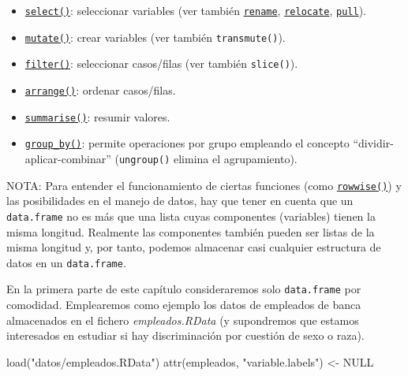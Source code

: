 \documentclass[
]{book}
\newenvironment{Shaded}{\begin{snugshade}}{\end{snugshade}}
\newcommand{\ConstantTok}[1]{\textcolor[rgb]{0.00,0.00,0.00}{#1}}
\newcommand{\FunctionTok}[1]{\textcolor[rgb]{0.00,0.00,0.00}{#1}}
\newcommand{\NormalTok}[1]{#1}
\newcommand{\OtherTok}[1]{\textcolor[rgb]{0.56,0.35,0.01}{#1}}
\newcommand{\StringTok}[1]{\textcolor[rgb]{0.31,0.60,0.02}{#1}}
\theoremstyle{break}
\theoremstyle{nonumberplain}
\begin{document}
\begin{itemize}
\item
  \href{https://dplyr.tidyverse.org/reference/select.html}{\texttt{select()}}: seleccionar variables (ver también \href{https://dplyr.tidyverse.org/reference/rename.html}{\texttt{rename}}, \href{https://dplyr.tidyverse.org/reference/rename.html}{\texttt{relocate}}, \href{https://dplyr.tidyverse.org/reference/rename.html}{\texttt{pull}}).
\item
  \href{https://dplyr.tidyverse.org/reference/mutate.html}{\texttt{mutate()}}: crear variables (ver también \texttt{transmute()}).
\item
  \href{https://dplyr.tidyverse.org/reference/filter.html}{\texttt{filter()}}: seleccionar casos/filas (ver también \texttt{slice()}).
\item
  \href{https://dplyr.tidyverse.org/reference/arrange.html}{\texttt{arrange()}}: ordenar casos/filas.
\item
  \href{https://dplyr.tidyverse.org/reference/summarise.html}{\texttt{summarise()}}: resumir valores.
\item
  \href{https://dplyr.tidyverse.org/reference/group_by.html}{\texttt{group\_by()}}: permite operaciones por grupo empleando el concepto ``dividir-aplicar-combinar'' (\texttt{ungroup()} elimina el agrupamiento).
\end{itemize}

NOTA: Para entender el funcionamiento de ciertas funciones (como \href{https://dplyr.tidyverse.org/reference/rowwise.html}{\texttt{rowwise()}}) y las posibilidades en el manejo de datos, hay que tener en cuenta que un \texttt{data.frame} no es más que una lista cuyas componentes (variables) tienen la misma longitud.
Realmente las componentes también pueden ser listas de la misma longitud y, por tanto, podemos almacenar casi cualquier estructura de datos en un \texttt{data.frame}.

En la primera parte de este capítulo consideraremos solo \texttt{data.frame} por comodidad.
Emplearemos como ejemplo los datos de empleados de banca almacenados en el fichero \emph{empleados.RData} (y supondremos que estamos interesados en estudiar si hay discriminación por cuestión de sexo o raza).

\begin{Shaded}
\begin{Highlighting}[]
\FunctionTok{load}\NormalTok{(}\StringTok{"datos/empleados.RData"}\NormalTok{)}
\FunctionTok{attr}\NormalTok{(empleados, }\StringTok{"variable.labels"}\NormalTok{) }\OtherTok{\textless{}{-}} \ConstantTok{NULL}                  
\end{Highlighting}
\end{Shaded}
\end{document}
